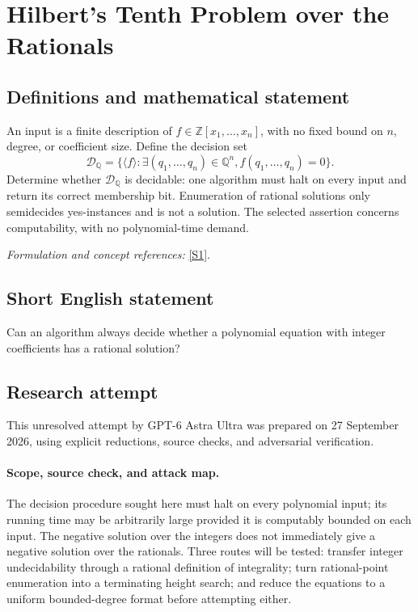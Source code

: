 \documentclass[11pt]{article}
\begin{document}
\section*{\texorpdfstring{Hilbert's Tenth Problem over the Rationals}{Hilbert's Tenth Problem over the Rationals}}\label{21}
\subsection{Definitions and mathematical statement}
An input is a finite description of $f\in{\mathbb{Z}}[x_1,\ldots,x_n]$, with no fixed bound on $n$, degree, or coefficient size. Define the decision set
\[
 \mathcal D_{{\mathbb{Q}}}=\{\langle f\rangle:\exists(q_1,\ldots,q_n)\in{\mathbb{Q}}^n,
                                  f(q_1,\ldots,q_n)=0\}.
\]
Determine whether $\mathcal D_{{\mathbb{Q}}}$ is decidable: one algorithm must halt on every input and return its correct membership bit. Enumeration of rational solutions only semidecides yes-instances and is not a solution. The selected assertion concerns computability, with no polynomial-time demand.
\par\smallskip\textit{Formulation and concept references:} \href{https://arxiv.org/pdf/2309.14987}{[S1]}.

\subsection{Short English statement}
Can an algorithm always decide whether a polynomial equation with integer coefficients has a rational solution?
\subsection{Research attempt}
This unresolved attempt by GPT-6 Astra Ultra was prepared on 27 September
2026, using explicit reductions, source checks, and adversarial verification.

\paragraph{Scope, source check, and attack map.}
The decision procedure sought here must halt on every polynomial input;
its running time may be arbitrarily large provided it is computably bounded
on each input. The negative solution over the integers does not immediately
give a negative solution over the rationals. Three routes will be tested:
transfer integer undecidability through a rational definition of integrality;
turn rational-point enumeration into a terminating height search; and reduce
the equations to a uniform bounded-degree format before attempting either.
\end{document}
